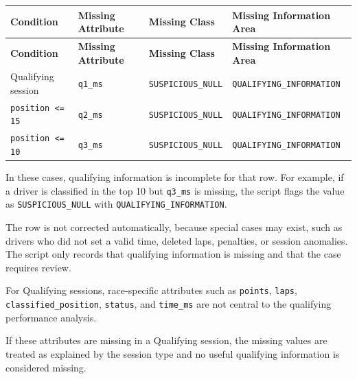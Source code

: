 \documentclass[a4paper,11pt]{article}
\begin{document}
	\begin{longtable}{p{4cm}p{2.2cm}p{3.3cm}p{4.4cm}}
		\toprule
		\textbf{Condition} & \textbf{Missing Attribute} & \textbf{Missing Class} & \textbf{Missing Information Area} \\
		\midrule
		\endfirsthead
		
		\toprule
		\textbf{Condition} & \textbf{Missing Attribute} & \textbf{Missing Class} & \textbf{Missing Information Area} \\
		\midrule
		\endhead
		
		Qualifying session
		& \texttt{q1\_ms}
		& \texttt{SUSPICIOUS\_NULL}
		& \texttt{QUALIFYING\_INFORMATION} \\
		\midrule
		
		\texttt{position <= 15}
		& \texttt{q2\_ms}
		& \texttt{SUSPICIOUS\_NULL}
		& \texttt{QUALIFYING\_INFORMATION} \\
		\midrule
		
		\texttt{position <= 10}
		& \texttt{q3\_ms}
		& \texttt{SUSPICIOUS\_NULL}
		& \texttt{QUALIFYING\_INFORMATION} \\
		\bottomrule
	\end{longtable}
	
	In these cases, qualifying information is incomplete for that row.
	For example, if a driver is classified in the top 10 but \texttt{q3\_ms} is missing,
	the script flags the value as \texttt{SUSPICIOUS\_NULL} with
	\texttt{QUALIFYING\_INFORMATION}.
	
	The row is not corrected automatically, because special cases may exist, such as
	drivers who did not set a valid time, deleted laps, penalties, or session anomalies.
	The script only records that qualifying information is missing and that the case
	requires review.
	
	\vspace{2em}
	
	For Qualifying sessions, race-specific attributes such as \texttt{points},
	\texttt{laps}, \texttt{classified\_position}, \texttt{status}, and \texttt{time\_ms}
	are not central to the qualifying performance analysis.
	
	If these attributes are missing in a Qualifying session, the missing values are treated
	as explained by the session type and no useful qualifying information is considered
	missing.
	
\end{document}
